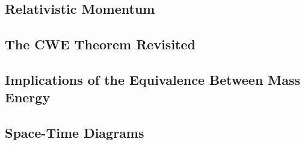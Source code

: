 \documentclass[twocolumn]{article}
\begin{document}
\subsection{Relativistic Momentum}
\begin{outline}
\1 
\end{outline}
\subsection{The CWE Theorem Revisited}
\begin{outline}
\1 
\end{outline}
\subsection{Implications of the Equivalence Between Mass Energy}
\begin{outline}
\1 
\end{outline}
\subsection{Space-Time Diagrams}
\begin{outline}
\1 
\end{outline}
\end{document}
